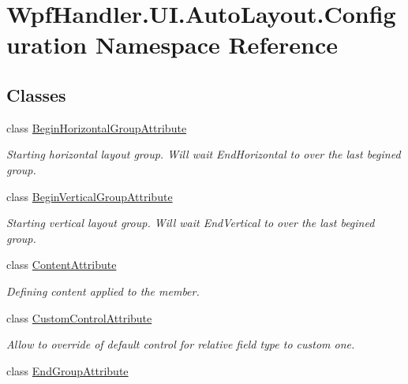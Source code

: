 \hypertarget{namespace_wpf_handler_1_1_u_i_1_1_auto_layout_1_1_configuration}{}\section{Wpf\+Handler.\+U\+I.\+Auto\+Layout.\+Configuration Namespace Reference}
\label{namespace_wpf_handler_1_1_u_i_1_1_auto_layout_1_1_configuration}
\subsection*{Classes}
\begin{DoxyCompactItemize}
\item 
class \mbox{\hyperlink{class_wpf_handler_1_1_u_i_1_1_auto_layout_1_1_configuration_1_1_begin_horizontal_group_attribute}{Begin\+Horizontal\+Group\+Attribute}}
\begin{DoxyCompactList}\small\item\em Starting horizontal layout group. Will wait End\+Horizontal to over the last begined group. \end{DoxyCompactList}\item 
class \mbox{\hyperlink{class_wpf_handler_1_1_u_i_1_1_auto_layout_1_1_configuration_1_1_begin_vertical_group_attribute}{Begin\+Vertical\+Group\+Attribute}}
\begin{DoxyCompactList}\small\item\em Starting vertical layout group. Will wait End\+Vertical to over the last begined group. \end{DoxyCompactList}\item 
class \mbox{\hyperlink{class_wpf_handler_1_1_u_i_1_1_auto_layout_1_1_configuration_1_1_content_attribute}{Content\+Attribute}}
\begin{DoxyCompactList}\small\item\em Defining content applied to the member. \end{DoxyCompactList}\item 
class \mbox{\hyperlink{class_wpf_handler_1_1_u_i_1_1_auto_layout_1_1_configuration_1_1_custom_control_attribute}{Custom\+Control\+Attribute}}
\begin{DoxyCompactList}\small\item\em Allow to override of default control for relative field type to custom one. \end{DoxyCompactList}\item 
class \mbox{\hyperlink{class_wpf_handler_1_1_u_i_1_1_auto_layout_1_1_configuration_1_1_end_group_attribute}{End\+Group\+Attribute}}

\end{DoxyCompactItemize}
